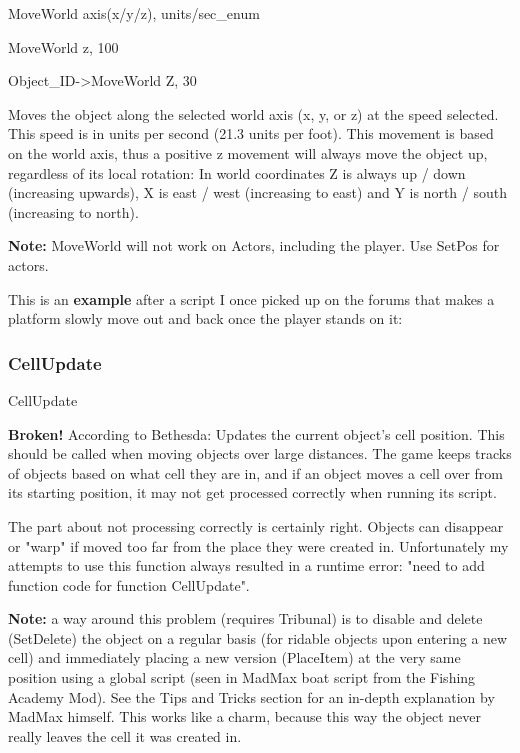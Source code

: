 \documentclass[
]{article}
\begin{document}
MoveWorld axis(x/y/z), units/sec\_enum

MoveWorld z, 100

Object\_ID-\textgreater MoveWorld Z, 30

Moves the object along the selected world axis (x, y, or z) at the speed
selected. This speed is in units per second (21.3 units per foot). This
movement is based on the world axis, thus a positive z movement will
always move the object up, regardless of its local rotation: In world
coordinates Z is always up / down (increasing upwards), X is east / west
(increasing to east) and Y is north / south (increasing to north).

\textbf{Note:} MoveWorld will not work on Actors, including the player.
Use SetPos for actors.

This is an \textbf{example} after a script I once picked up on the
forums that makes a platform slowly move out and back once the player
stands on it:



\hypertarget{cellupdate}{%
\subsubsection{CellUpdate}\label{cellupdate}}

CellUpdate

\textbf{Broken!} According to Bethesda: Updates the current object's
cell position. This should be called when moving objects over large
distances. The game keeps tracks of objects based on what cell they are
in, and if an object moves a cell over from its starting position, it
may not get processed correctly when running its script.

The part about not processing correctly is certainly right. Objects can
disappear or "warp" if moved too far from the place they were created
in. Unfortunately my attempts to use this function always resulted in a
runtime error: "need to add function code for function CellUpdate".

\textbf{Note:} a way around this problem (requires Tribunal) is to
disable and delete (SetDelete) the object on a regular basis (for
ridable objects upon entering a new cell) and immediately placing a new
version (PlaceItem) at the very same position using a global script
(seen in MadMax boat script from the Fishing Academy Mod). See the Tips
and Tricks section for an in-depth explanation by MadMax himself. This
works like a charm, because this way the object never really leaves the
cell it was created in.
\end{document}
